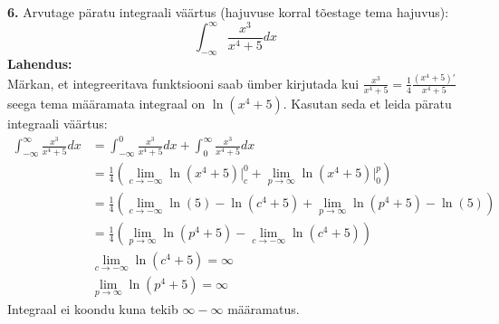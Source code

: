 \documentclass{article}
\begin{document}
\textbf{6.} Arvutage p\"aratu integraali v\"a\"artus (hajuvuse korral t\~oestage tema hajuvus):
\begin{equation*}
\int_{-\infty}^\infty\frac{x^3}{x^4+5}dx
\end{equation*}
\textbf{Lahendus:}\\
M\"arkan, et integreeritava funktsiooni saab \"umber kirjutada kui $\displaystyle\frac{x^3}{x^4+5}=\frac{1}{4}\frac{(x^4+5)'}{x^4+5}$ seega tema m\"a\"aramata integraal on $\ln(x^4+5)$. Kasutan seda et leida p\"aratu integraali v\"a\"artus:
\begin{equation*}
\begin{aligned}
\int_{-\infty}^\infty\frac{x^3}{x^4+5}dx&=\int_{-\infty}^0\frac{x^3}{x^4+5}dx+\int_0^\infty\frac{x^3}{x^4+5}dx\\
&=\frac{1}{4}(\lim_{c\to-\infty}\ln(x^4+5)\Big|_c^0+\lim_{p\to\infty}\ln(x^4+5)\Big|_0^p)\\
&=\frac{1}{4}(\lim_{c\to-\infty}\ln(5)-\ln(c^4+5)+\lim_{p\to\infty}\ln(p^4+5)-\ln(5))\\
&=\frac{1}{4}(\lim_{p\to\infty}\ln(p^4+5)-\lim_{c\to-\infty}\ln(c^4+5))\\
&\lim_{c\to-\infty}\ln(c^4+5)=\infty\\
&\lim_{p\to\infty}\ln(p^4+5)=\infty
\end{aligned}
\end{equation*}
Integraal ei koondu kuna tekib $\infty-\infty$ m\"a\"aramatus.
\end{document}
